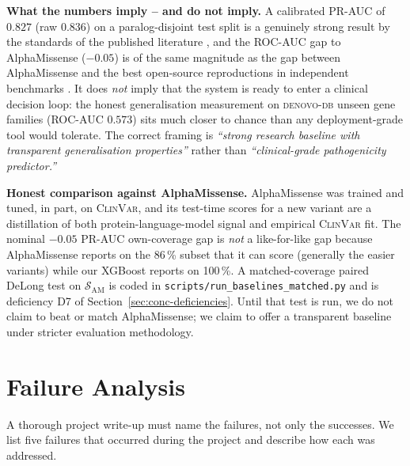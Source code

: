\documentclass[11pt,a4paper,oneside]{report}
\begin{document}
\textbf{What the numbers imply -- and do not imply.} A
calibrated PR-AUC of $0.827$ (raw $0.836$) on a
paralog-disjoint test split is a
genuinely strong result by the standards of the published
literature \citep{cheng2023alphamissense, lin2024varipred},
and the ROC-AUC gap to AlphaMissense ($-0.05$) is of the
same magnitude as the gap between AlphaMissense and the
best open-source reproductions in independent benchmarks
\citep{livesey2023benchmark}. It does \emph{not} imply that
the system is ready to enter a clinical decision loop: the
honest generalisation measurement on \textsc{denovo-db}
unseen gene families (ROC-AUC $0.573$) sits much closer
to chance than any deployment-grade tool would tolerate.
The correct framing is \emph{``strong research baseline
with transparent generalisation properties''} rather than
\emph{``clinical-grade pathogenicity predictor.''}

\textbf{Honest comparison against AlphaMissense.}
AlphaMissense was trained and tuned, in part, on
\textsc{ClinVar}, and its test-time scores for a new
variant are a distillation of both protein-language-model
signal and empirical \textsc{ClinVar} fit. The nominal
$-0.05$ PR-AUC own-coverage gap is \emph{not} a
like-for-like gap because AlphaMissense reports on the
86\,\% subset that it can score (generally the easier
variants) while our XGBoost reports on 100\,\%. A
matched-coverage paired DeLong test on
$\mathcal{S}_{\text{AM}}$ is coded in
\texttt{scripts/run\_baselines\_matched.py} and is
deficiency D7 of Section~\ref{sec:conc-deficiencies}.
Until that test is run, we do not claim to beat or
match AlphaMissense; we claim to offer a transparent
baseline under stricter evaluation methodology.

\section{Failure Analysis}
\label{sec:conc-failures}

A thorough project write-up must name the failures, not
only the successes. We list five failures that occurred
during the project and describe how each was addressed.
\end{document}
